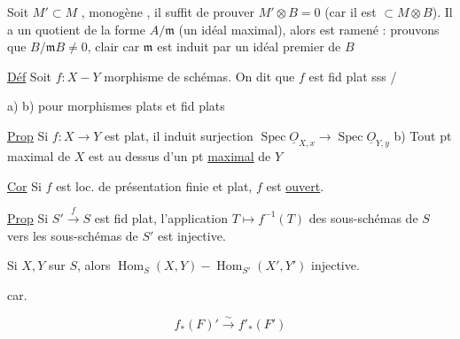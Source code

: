  Soit $M'\subset M$ , monogène  , il suffit de prouver $M'\otimes B=0$ (car il est $\subset M\otimes B$). Il a un quotient de la forme $A/\mathfrak m$ (un idéal maximal), alors   est ramené : prouvons que $B/\mathfrak mB\ne0$, clair car $\mathfrak m$ est induit par un idéal premier de $B$

\uline{Déf} Soit $f:X\mathrel{-}Y$ morphisme de   schémas.  On dit que  $f$ est fid plat sss \quad /

a) b) pour morphismes plats et fid plats

\uline{Prop} Si $f:X\longrightarrow Y$ est plat,  il induit   surjection $\operatorname{Spec}\underline O_{X,x}\longrightarrow\operatorname{Spec}\underline O_{Y,y}$ \quad b) Tout pt maximal de $X$ est au dessus d'un pt \uline{maximal} de $Y$


\uline{Cor} Si $f$ est loc. de présentation finie et plat, $f$ est  \uline{ouvert}.

\uline{Prop} Si $S'\overset{f}{\longrightarrow}S$ est fid plat, l'application $T\longmapsto f^{-1}(T)$ des sous-schémas de $S$ vers les sous-schémas de $S'$  est injective.

\uline{} Si $X,Y$ sur $S$, alors $\operatorname{Hom}_S(X,Y)\mathrel{-}\operatorname{Hom}_{S'}(X',Y')$ injective.


car.


\[
 f_*(F)'\overset{\sim}{\longrightarrow}f'_*(F')
\]


